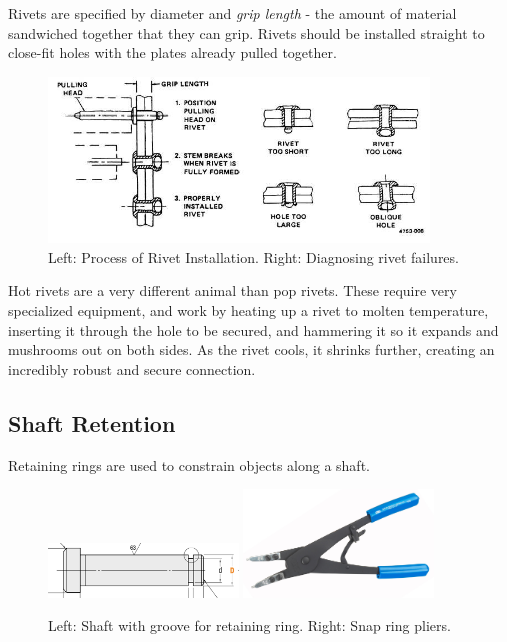 	Rivets are specified by diameter and \textit{grip length} - the amount of material sandwiched together that they can grip. Rivets should be installed straight to close-fit holes with the plates already pulled together.
	
	\begin{figure}[H] \centering
		\includegraphics[width=0.9\textwidth]{imgs/rivet_install.jpeg}
		\caption{Left: Process of Rivet Installation. Right: Diagnosing rivet failures.}
	\end{figure}
	
	Hot rivets are a very different animal than pop rivets. These require very specialized equipment, and work by heating up a rivet to molten temperature, inserting it through the hole to be secured, and hammering it so it expands and mushrooms out on both sides. As the rivet cools, it shrinks further, creating an incredibly robust and secure connection.	
	
	\subsection{Shaft Retention}
	Retaining rings are used to constrain objects along a shaft.
	
	\begin{figure}[H]
		\centering
		\includegraphics[width=0.45\textwidth]{imgs/shaft_snapringgroove.png}
		\includegraphics[width=0.45\textwidth]{imgs/snapringtool.jpeg}
		\caption{Left: Shaft with groove for retaining ring. Right: Snap ring pliers.}
	\end{figure}
	
